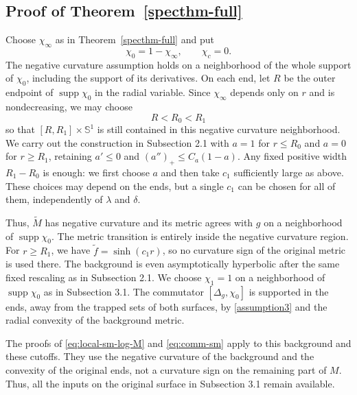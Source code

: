 \documentclass[11pt]{amsart}
\newcommand{\la}{\lambda}
\begin{document}
\subsection{Proof of Theorem~\ref{specthm-full}}

Choose $\chi_\infty$ as in Theorem~\ref{specthm-full} and put
\[
\chi_0=1-\chi_\infty,\qquad \chi_c=0.
\]
The negative curvature assumption holds on a neighborhood of the whole support of $\chi_0$, including the support of its derivatives. On each end, let $R$ be the outer endpoint of $\operatorname{supp}\chi_0$ in the radial variable. Since $\chi_\infty$ depends only on $r$ and is nondecreasing, we may choose
\[
R<R_0<R_1
\]
so that $[R,R_1]\times\mathbb S^1$ is still contained in this negative curvature neighborhood. We carry out the construction in Subsection 2.1 with $a=1$ for $r\leq R_0$ and $a=0$ for $r\geq R_1$, retaining $a'\leq0$ and $(a'')_+\leq C_a(1-a)$. Any fixed positive width $R_1-R_0$ is enough: we first choose $a$ and then take $c_1$ sufficiently large as above. These choices may depend on the ends, but a single $c_1$ can be chosen for all of them, independently of $\la$ and $\delta$.

Thus, $\tilde M$ has negative curvature and its metric agrees with $g$ on a neighborhood of $\operatorname{supp}\chi_0$. The metric transition is entirely inside the negative curvature region. For $r\geq R_1$, we have $\tilde f=\sinh(c_1r)$, so no curvature sign of the original metric is used there. The background is even asymptotically hyperbolic after the same fixed rescaling as in Subsection 2.1. We choose $\chi_1=1$ on a neighborhood of $\operatorname{supp}\chi_0$ as in Subsection 3.1. The commutator $[\Delta_g,\chi_0]$ is supported in the ends, away from the trapped sets of both surfaces, by \eqref{assumption3} and the radial convexity of the background metric.

The proofs of \eqref{eq:local-sm-log-M} and \eqref{eq:comm-sm} apply to this background and these cutoffs. They use the negative curvature of the background and the convexity of the original ends, not a curvature sign on the remaining part of $M$. Thus, all the inputs on the original surface in Subsection 3.1 remain available.
\end{document}
